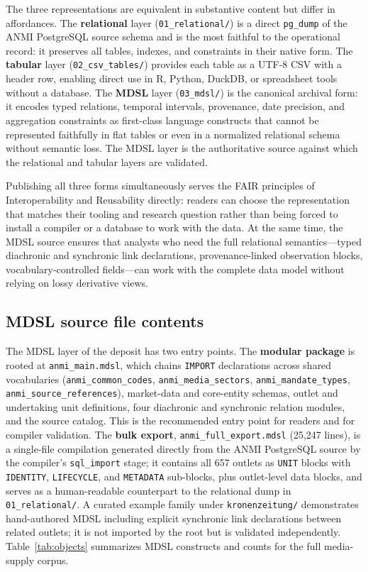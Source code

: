 \documentclass[11pt]{article}
\begin{document}
The three representations are equivalent in substantive content but differ in affordances. The \textbf{relational} layer (\texttt{01\_relational/}) is a direct \texttt{pg\_dump} of the ANMI PostgreSQL source schema and is the most faithful to the operational record: it preserves all tables, indexes, and constraints in their native form. The \textbf{tabular} layer (\texttt{02\_csv\_tables/}) provides each table as a UTF-8 CSV with a header row, enabling direct use in R, Python, DuckDB, or spreadsheet tools without a database. The \textbf{MDSL} layer (\texttt{03\_mdsl/}) is the canonical archival form: it encodes typed relations, temporal intervals, provenance, date precision, and aggregation constraints as first-class language constructs that cannot be represented faithfully in flat tables or even in a normalized relational schema without semantic loss. The MDSL layer is the authoritative source against which the relational and tabular layers are validated.

Publishing all three forms simultaneously serves the FAIR principles of Interoperability and Reusability directly: readers can choose the representation that matches their tooling and research question rather than being forced to install a compiler or a database to work with the data. At the same time, the MDSL source ensures that analysts who need the full relational semantics---typed diachronic and synchronic link declarations, provenance-linked observation blocks, vocabulary-controlled fields---can work with the complete data model without relying on lossy derivative views.

\subsection{MDSL source file contents}

The MDSL layer of the deposit has two entry points. The \textbf{modular package} is rooted at \texttt{anmi\_main.mdsl}, which chains \texttt{IMPORT} declarations across shared vocabularies (\texttt{anmi\_common\_codes}, \texttt{anmi\_media\_sectors}, \texttt{anmi\_mandate\_types}, \texttt{anmi\_source\_references}), market-data and core-entity schemas, outlet and undertaking unit definitions, four diachronic and synchronic relation modules, and the source catalog. This is the recommended entry point for readers and for compiler validation. The \textbf{bulk export}, \texttt{anmi\_full\_export.mdsl} (25{,}247 lines), is a single-file compilation generated directly from the ANMI PostgreSQL source by the compiler's \texttt{sql\_import} stage; it contains all 657 outlets as \texttt{UNIT} blocks with \texttt{IDENTITY}, \texttt{LIFECYCLE}, and \texttt{METADATA} sub-blocks, plus outlet-level data blocks, and serves as a human-readable counterpart to the relational dump in \texttt{01\_relational/}. A curated example family under \texttt{kronenzeitung/} demonstrates hand-authored MDSL including explicit synchronic link declarations between related outlets; it is not imported by the root but is validated independently. Table~\ref{tab:objects} summarizes MDSL constructs and counts for the full media-supply corpus.
\end{document}
